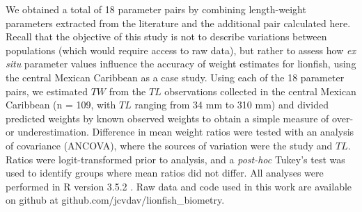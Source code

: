 \documentclass[fleqn,10pt,lineno]{wlpeerj} %
\begin{document}
We obtained a total of 18 parameter pairs by combining length-weight
parameters extracted from the literature and the additional pair
calculated here. Recall that the objective of this study is not to
describe variations between populations (which would require access to
raw data), but rather to assess how \emph{ex situ} parameter values
influence the accuracy of weight estimates for lionfish, using the
central Mexican Caribbean as a case study. Using each of the 18
parameter pairs, we estimated \(TW\) from the \(TL\) observations
collected in the central Mexican Caribbean (n = 109, with \(TL\) ranging
from 34 mm to 310 mm) and divided predicted weights by known observed
weights to obtain a simple measure of over- or underestimation.
Difference in mean weight ratios were tested with an analysis of
covariance (ANCOVA), where the sources of variation were the study and
\(TL\). Ratios were logit-transformed prior to analysis, and a
\emph{post-hoc} Tukey's test was used to identify groups where mean
ratios did not differ. All analyses were performed in R version 3.5.2
\citep{rcore_2018}. Raw data and code used in this work are available on
github at github.com/jcvdav/lionfish\_biometry.
\end{document}
